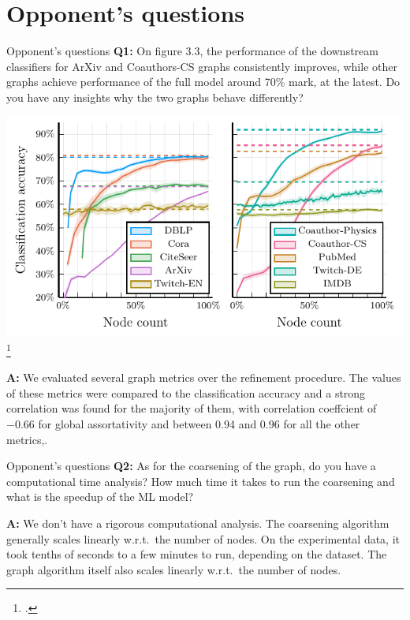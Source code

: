 \documentclass[10pt]{beamer}
\begin{document}
\begin{frame}
	\titlepage
\end{frame}

\section{Opponent's questions}

\begin{frame}{Opponent's questions}
	\textbf{Q1:} On figure 3.3, the performance of the downstream classifiers for ArXiv and Coauthors-CS graphs consistently improves, while other graphs achieve performance of the full model around 70\% mark, at the latest. Do you have any insights why the two graphs behave differently?
	\begin{center}
		\includegraphics[width=0.5\pagewidth]{images/adaptive-coarsening/adaptive-coarsening.pdf}\footcite{dedic_balancing_2024}
	\end{center}

	\textbf{A:} We evaluated several graph metrics over the refinement procedure. The values of these metrics were compared to the classification accuracy and a strong correlation was found for the majority of them, with correlation coeffcient of −0.66 for global assortativity and between 0.94 and 0.96 for all the other metrics,.
\end{frame}

\begin{frame}{Opponent's questions}
	\textbf{Q2:} As for the coarsening of the graph, do you have a computational time analysis? How much time it takes to run the coarsening and what is the speedup of the ML model?

	\textbf{A:} We don't have a rigorous computational analysis. The coarsening algorithm generally scales linearly w.r.t.\ the number of nodes. On the experimental data, it took tenths of seconds to a few minutes to run, depending on the dataset. The graph algorithm itself also scales linearly w.r.t.\ the number of nodes.
\end{frame}
\end{document}
